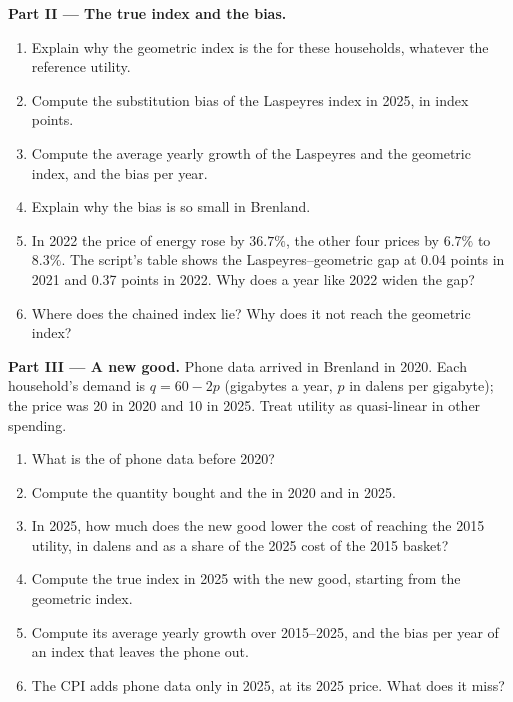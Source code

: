 \begin{problem}
\medskip\noindent\textbf{Part II --- The true index and the bias.}
\begin{enumerate}[resume]
  \item Explain why the geometric index is the  for these households, whatever the reference utility.
  \item Compute the substitution bias of the Laspeyres index in 2025, in index points.
  \item Compute the average yearly growth of the Laspeyres and the geometric index, and the bias per year.
  \item Explain why the bias is so small in Brenland.
  \item In 2022 the price of energy rose by $36.7\%$, the other four prices by
    $6.7\%$ to $8.3\%$. %
    The script's table shows the Laspeyres--geometric gap at 0.04 points in
    2021 and 0.37 points in 2022. Why does a year like 2022 widen the
    gap? %
  \item Where does the chained index lie? Why does it not reach the geometric index?
\end{enumerate}

\medskip\noindent\textbf{Part III --- A new good.} Phone data arrived in
Brenland in 2020. Each household's demand is $q = 60 - 2p$ (gigabytes a year,
$p$ in dalens per gigabyte); the price was 20 in 2020 and 10 in 2025. Treat
utility as quasi-linear in other spending.
\begin{enumerate}[resume]
  \item What is the  of phone data before 2020?
  \item Compute the quantity bought and the  in 2020 and in 2025.
  \item In 2025, how much does the new good lower the cost of reaching the 2015 utility, in dalens and as a share of the 2025 cost of the 2015 basket?
  \item Compute the true index in 2025 with the new good, starting from the geometric index.
  \item Compute its average yearly growth over 2015--2025, and the bias per year of an index that leaves the phone out.
  \item The CPI adds phone data only in 2025, at its 2025 price. What does it miss?
\end{enumerate}


\end{problem}
